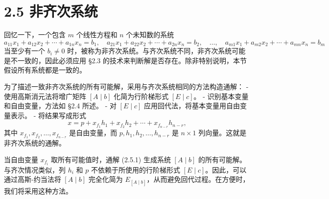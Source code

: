 \section*{2.5 非齐次系统}
回忆一下，一个包含 \(m\) 个线性方程和 \(n\) 个未知数的系统
\[
a_{11}x_{1} + a_{12}x_{2} + \cdots + a_{1n}x_{n} = b_{1}, \quad
a_{21}x_{1} + a_{22}x_{2} + \cdots + a_{2n}x_{n} = b_{2}, \quad \ldots, \quad
a_{m1}x_{1} + a_{m2}x_{2} + \cdots + a_{mn}x_{n} = b_{m}
\]
当至少有一个 \(b_{i} \neq 0\) 时，被称为非齐次系统。与齐次系统不同，非齐次系统可能是不一致的，因此必须应用 §2.3 的技术来判断解是否存在。除非特别说明，本节假设所有系统都是一致的。

为了描述一致非齐次系统的所有可能解，采用与齐次系统相同的方法构造通解：
- 使用高斯消元法将增广矩阵 \([A \mid b]\) 化简为行阶梯形式 \([E \mid c]\)。
- 识别基本变量和自由变量，方法如 §2.4 所述。
- 对 \([E \mid c]\) 应用回代法，将基本变量用自由变量表示。
- 将结果写成形式
  \[
  x = p + x_{f_{1}} h_{1} + x_{f_{2}} h_{2} + \cdots + x_{f_{n-r}} h_{n-r},
  \]
  其中 \(x_{f_{1}}, x_{f_{2}}, \ldots, x_{f_{n-r}}\) 是自由变量，而 \(p, h_{1}, h_{2}, \ldots, h_{n-r}\) 是 \(n \times 1\) 列向量。这就是非齐次系统的通解。

当自由变量 \(x_{f_{i}}\) 取所有可能值时，通解 (2.5.1) 生成系统 \([A \mid b]\) 的所有可能解。与齐次情况类似，列 \(h_{i}\) 和 \(p\) 不依赖于所使用的行阶梯形式 \([E \mid c]\)。因此，可以通过高斯-约当法将 \([A \mid b]\) 完全化简为 \(E_{[A \mid b]}\)，从而避免回代过程。在方便时，我们将采用这种方法。

